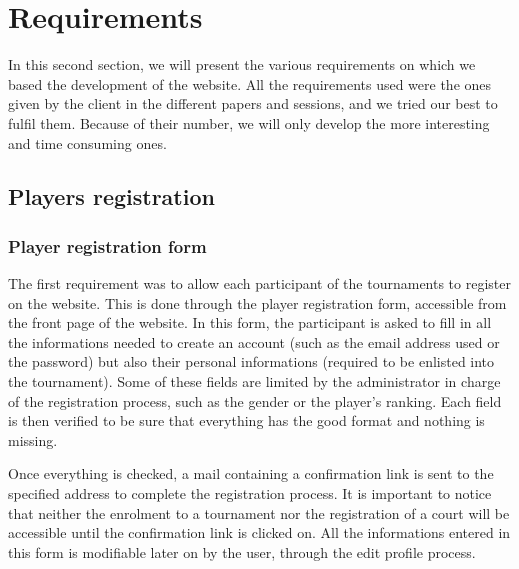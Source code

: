 \section{Requirements}
\label{sec:Requirements}


In this second section, we will present the various requirements on which we based the development of the website. All the requirements used were the ones given by the client in the different papers and sessions, and we tried our best to fulfil them. Because of their number, we will only develop the more interesting and time consuming ones.

\subsection{Players registration}
\label{sub:Players registration}

\subsubsection{Player registration form}
\label{subs:Registration form}


The first requirement was to allow each participant of the tournaments to register on the website. This is done through the player registration form, accessible from the front page of the website. In this form, the participant is asked to fill in all the informations needed to create an account (such as the email address used or the password) but also their personal informations (required to be enlisted into the tournament). Some of these fields are limited by the administrator in charge of the registration process, such as the gender or the player's ranking. Each field is then verified to be sure that everything has the good format and nothing is missing. \newline

Once everything is checked, a mail containing a confirmation link is sent to the specified address to complete the registration process. It is important to notice that neither the enrolment to a tournament nor the registration of a court will be accessible until the confirmation link is clicked on. All the informations entered in this form is modifiable later on by the user, through the edit profile process. \newline

